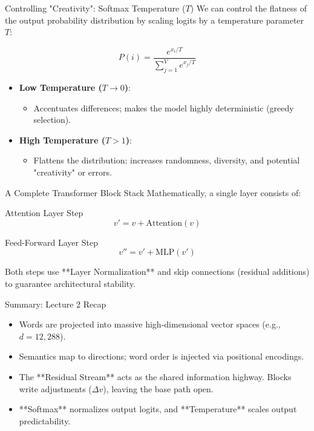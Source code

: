 \documentclass[aspectratio=169]{beamer}
\begin{document}
\begin{frame}{Controlling "Creativity": Softmax Temperature ($T$)}
  We can control the flatness of the output probability distribution by scaling logits by a temperature parameter $T$:
  
  \[
  P(i) = \frac{e^{x_i / T}}{\sum_{j=1}^V e^{x_j / T}}
  \]
  
  \begin{itemize}
    \item \textbf{Low Temperature ($T \to 0$)}:
      \begin{itemize}
        \item Accentuates differences; makes the model highly deterministic (greedy selection).
      \end{itemize}
    \item \textbf{High Temperature ($T > 1$)}:
      \begin{itemize}
        \item Flattens the distribution; increases randomness, diversity, and potential "creativity" or errors.
      \end{itemize}
  \end{itemize}
\end{frame}

\begin{frame}{A Complete Transformer Block Stack}
  Mathematically, a single layer consists of:
  
  \begin{block}{Attention Layer Step}
    \[
    v' = v + \text{Attention}(v)
    \]
  \end{block}
  
  \begin{block}{Feed-Forward Layer Step}
    \[
    v'' = v' + \text{MLP}(v')
    \]
  \end{block}
  
  Both steps use **Layer Normalization** and skip connections (residual additions) to guarantee architectural stability.
\end{frame}

\begin{frame}{Summary: Lecture 2 Recap}
  \begin{itemize}
    \item Words are projected into massive high-dimensional vector spaces (e.g., $d=12,288$).
    \item Semantics map to directions; word order is injected via positional encodings.
    \item The **Residual Stream** acts as the shared information highway. Blocks write adjustments ($\Delta v$), leaving the base path open.
    \item **Softmax** normalizes output logits, and **Temperature** scales output predictability.
  \end{itemize}
\end{frame}
\end{document}
